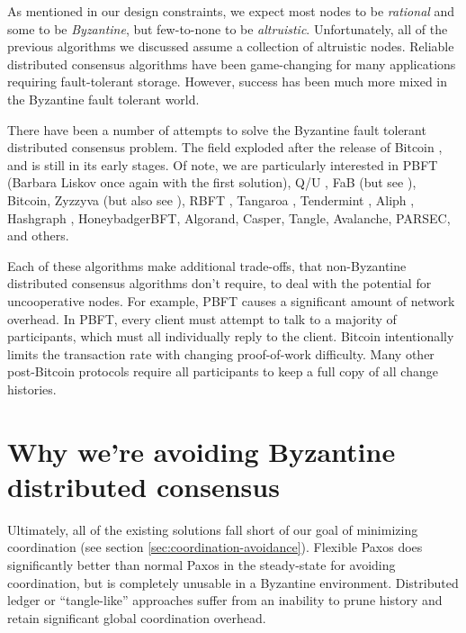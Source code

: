 \documentclass[8pt,fleqn,openany]{book}
\begin{document}
As mentioned in our design constraints, we expect most nodes to be {\em
rational} and some to be {\em Byzantine}, but few-to-none to be {\em
altruistic}. Unfortunately, all of the previous algorithms we discussed assume a
collection of altruistic nodes.
Reliable distributed consensus algorithms have been game-changing for many
applications requiring fault-tolerant storage. However, success has been much
more mixed in the Byzantine fault tolerant world.

There have been a number of attempts to solve the Byzantine fault tolerant
distributed consensus problem. The field exploded after the release of Bitcoin
\cite{bitcoin}, and is still in its early stages. Of note, we are particularly
interested in PBFT \cite{pbft} (Barbara Liskov once again with the
first solution), Q/U \cite{qu}, FaB \cite{fab} (but see
\cite{fab-revisited}), Bitcoin, Zyzzyva \cite{zyzzyva} (but also
see \cite{fab-revisited}), RBFT \cite{rbft}, Tangaroa \cite{tangaroa},
Tendermint \cite{tendermint}, Aliph \cite{aliph}, Hashgraph \cite{hashgraph},
HoneybadgerBFT\cite{honeybadger}, Algorand\cite{algorand}, Casper\cite{casper},
Tangle\cite{tangle}, Avalanche\cite{avalanche}, PARSEC\cite{parsec}, and
others\cite{mickens-bft}.

Each of these algorithms make
additional trade-offs, that non-Byzantine distributed consensus algorithms don't
require, to deal with the potential for uncooperative nodes. For example,
PBFT \cite{pbft} causes a significant amount of network overhead. In PBFT, every
client must attempt to talk to a majority of participants, which must all
individually reply to the client. Bitcoin
\cite{bitcoin} intentionally limits the transaction rate with changing
proof-of-work difficulty. Many other post-Bitcoin protocols require all
participants to keep a full copy of all change histories.

\section{Why we're avoiding Byzantine distributed consensus}

Ultimately, all of the existing solutions fall short of our goal of minimizing
coordination (see section \ref{sec:coordination-avoidance}). Flexible Paxos
\cite{paxos-flexible} does significantly better than normal Paxos in the
steady-state for avoiding coordination, but is completely unusable in a
Byzantine environment. Distributed ledger or ``tangle-like'' approaches suffer
from an inability to prune history and retain significant global coordination
overhead.
\end{document}
